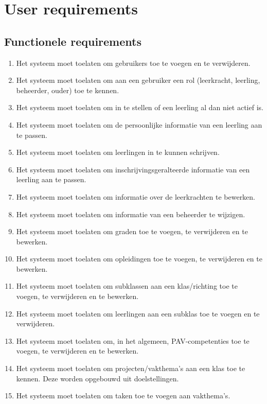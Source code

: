\documentclass[a4paper]{article}
\begin{document}
\section{User requirements}  \label{sec:user_req}%

\subsection{Functionele requirements}
\begin{enumerate}
\item Het systeem moet toelaten om gebruikers toe te voegen en te verwijderen.
\item Het systeem moet toelaten om aan een gebruiker een rol (leerkracht, leerling, beheerder, ouder) toe te kennen.
\item Het systeem moet toelaten om in te stellen of een leerling al dan niet actief is.
\item Het systeem moet toelaten om de persoonlijke informatie van een leerling aan te passen.
\item Het systeem moet toelaten om leerlingen in te kunnen schrijven.
\item Het systeem moet toelaten om inschrijvingsgeralteerde informatie van een leerling aan te passen.
\item Het systeem moet toelaten om informatie over de leerkrachten te bewerken.
\item Het systeem moet toelaten om informatie van een beheerder te wijzigen.
\item Het systeem moet toelaten om graden toe te voegen, te verwijderen en te bewerken.
\item Het systeem moet toelaten om opleidingen toe te voegen, te verwijderen en te bewerken.
\item Het systeem moet toelaten om subklassen aan een klas/richting toe te voegen, te verwijderen en te bewerken.  %
\item Het systeem moet toelaten om leerlingen aan een subklas toe te voegen en te verwijderen.
\item Het systeem moet toelaten om, in het algemeen, PAV-competenties toe te voegen, te verwijderen en te bewerken.
\item Het systeem moet toelaten om projecten/vakthema's aan een klas toe te kennen. Deze worden opgebouwd uit doelstellingen.
\item Het systeem moet toelaten om taken toe te voegen aan vakthema's.

\end{enumerate}
\end{document}
